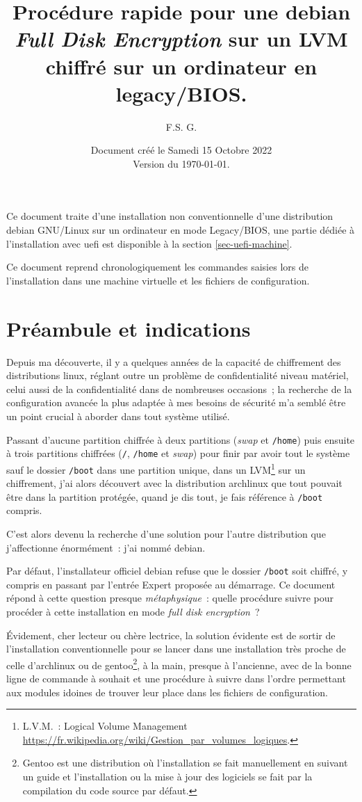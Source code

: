\documentclass[12pt, a4paper]{report}
\title{Procédure rapide pour une debian \emph{Full Disk Encryption} sur un LVM chiffré sur un ordinateur en legacy/BIOS.}
\author{F.S. G.}
\date{Document créé le Samedi 15 Octobre 2022\\Version du \today{}.}
\begin{document}
\maketitle

Ce document traite d'une installation non conventionnelle d'une distribution debian GNU/Linux sur un ordinateur en mode Legacy/BIOS, une partie dédiée à l'installation avec uefi est disponible à la section \ref{sec-uefi-machine}.

Ce document reprend chronologiquement les commandes saisies lors de l'installation dans une machine virtuelle et les fichiers de configuration.

\chapter*{Préambule et indications}
Depuis ma découverte, il y a quelques années de la capacité de chiffrement des distributions linux, réglant outre un problème de confidentialité niveau matériel, celui aussi de la confidentialité dans de nombreuses occasions~; la recherche de la configuration avancée la plus adaptée à mes besoins de sécurité m'a semblé être un point crucial à aborder dans tout système utilisé.

Passant d'aucune partition chiffrée à deux partitions (\emph{swap} et \texttt{/home}) puis ensuite à trois partitions chiffrées (\texttt{/}, \texttt{/home} et \emph{swap}) pour finir par avoir tout le système sauf le dossier \texttt{/boot} dans une partition unique, dans un LVM\footnote{L.V.M.~: Logical Volume Management \url{https://fr.wikipedia.org/wiki/Gestion_par_volumes_logiques}.} sur un chiffrement, j'ai alors découvert avec la distribution archlinux que tout pouvait être dans la partition protégée, quand je dis tout, je fais référence à \texttt{/boot} compris.

C'est alors devenu la recherche d'une solution pour l'autre distribution que j'affectionne énormément~: j'ai nommé debian.

Par défaut, l'installateur officiel debian refuse que le dossier \texttt{/boot} soit chiffré, y compris en passant par l'entrée Expert proposée au démarrage. 
Ce document répond à cette question presque \emph{métaphysique}~: quelle procédure suivre pour procéder à cette installation en mode \emph{full disk encryption}~?

Évidement, cher lecteur ou chère lectrice, la solution évidente est de sortir de l'installation conventionnelle pour se lancer dans une installation très proche de celle d'archlinux ou de gentoo\footnote{Gentoo est une distribution où l'installation se fait manuellement en suivant un guide et l'installation ou la mise à jour des logiciels se fait par la compilation du code source par défaut.}, à la main, presque à l'ancienne, avec de la bonne ligne de commande à souhait et une procédure à suivre dans l'ordre permettant aux modules idoines de trouver leur place dans les fichiers de configuration.
\end{document}
